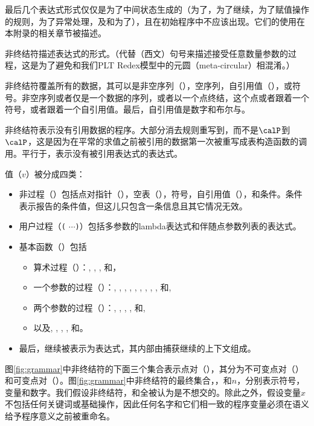 最后几个表达式形式仅仅是为了中间状态生成的（为了，为了继续，为了赋值操作的规则，为了异常处理，及和为了），且在初始程序中不应该出现。它们的使用在本附录的相关章节被描述。

非终结符描述表达式的形式。（代替（西文）句号来描述接受任意数量参数的过程，这是为了避免和我们PLT Redex模型中的元圆（meta-circular）相混淆。）

非终结符覆盖所有的数据，其可以是非空序列（），空序列，自引用值（），或符号。非空序列或者仅是一个数据的序列，或者以一个点终结，这个点或者跟着一个符号，或者跟着一个自引用值。最后，自引用值是数字和布尔\semtrue{}与\semfalse{}。

非终结符表示没有引用数据的程序。大部分消去规则重写到，而不是$\calP$到$\calP$，这是因为在平常的求值之前被引用的数据第一次被重写成表构造函数的调用。平行于，表示没有被引用表达式的表达式。

\beginfig
\begin{center}



\end{center}
\caption{引用}\label{fig:quote}
\endfig

值（$v$）被分成四类：
%
\begin{itemize}
\item 非过程（）包括点对指针（），空表（），符号，自引用值（），和条件。条件表示报告的条件值，但这儿只包含一条信息且其它情况无效。
\item 用户过程（\texttt{(}    $\cdots$\texttt{)}）包括多参数的lambda表达式和伴随点参数列表的表达式。
\item 基本函数（）包括

\begin{itemize}
\item
 算术过程（）：\va{+}, \va{-}, \va{/}, 和\va{*}，
\item
 一个参数的过程（）：, , , , , , , , , 和,
\item
 两个参数的过程（）：, , , , 和,
\item
 以及, , , , 和。
\end{itemize}
\item 最后，继续被表示为表达式，其内部由捕获继续的上下文组成。
\end{itemize}
%
图\ref{fig:grammar}中非终结符的下面三个集合表示点对（），其分为不可变点对（）和可变点对（）。图\ref{fig:grammar}中非终结符的最终集合，，和$n$，分别表示符号，变量和数字。我们假设非终结符，和全被认为是不想交的。除此之外，假设变量$x$不包括任何关键词或基础操作，因此任何名字和它们相一致的程序变量必须在语义给予程序意义之前被重命名。

